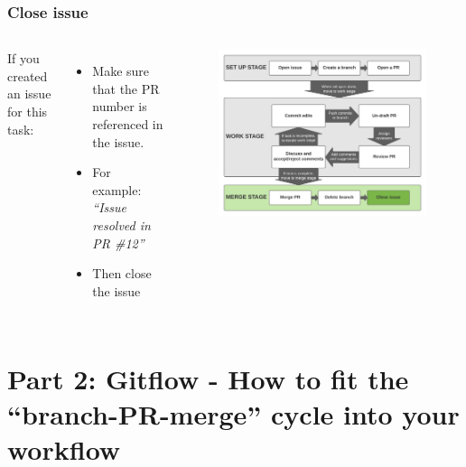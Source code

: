 \documentclass[aspectratio=169]{beamer} %
\begin{document}
\begin{frame}
	\frametitle{Close issue}
	\begin{columns}[c]

		If you created an issue for this task:
		\begin{itemize}
			\setlength\itemsep{.5em}
			\item Make sure that the PR number is referenced in the issue.
			\item For example: \textit{``Issue resolved in PR \#12''}
			\item Then close the issue
		\end{itemize}

		\vspace{-.75cm}
		\begin{figure}
			\centering
			\includegraphics[width=\textwidth]{./img/branch-pr-merge-cycle-S3-3.png}
		\end{figure}

	\end{columns}
\end{frame}



\section{Part 2: \newline Gitflow - How to fit the ``branch-PR-merge'' cycle into your workflow}
\end{document}
